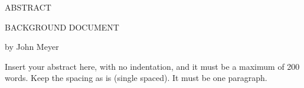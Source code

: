 \documentclass[12pt, oneside]{book2}
\newcommand{\documentTitle}{BACKGROUND DOCUMENT}
\newcommand{\documentAuthor}{John Meyer}
\theoremstyle{definition}
\begin{document}
\thispagestyle{empty}
\singlespacing

\begin{center}

    ABSTRACT

    \vspace{2.0cm}

    \documentTitle

    \vspace{1.0cm}

    by \documentAuthor

    \vspace{1.0cm}

\end{center}

\noindent
Insert your abstract here, with no indentation, and it must be a maximum of 200 words.
Keep the spacing as is (single spaced).
It must be one paragraph.

\newpage

\thispagestyle{empty}

\frontmatter

\doublespacing
\end{document}
